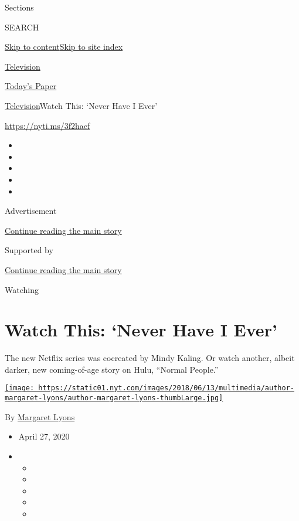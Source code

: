 Sections

SEARCH

\protect\hyperlink{site-content}{Skip to
content}\protect\hyperlink{site-index}{Skip to site index}

\href{https://www.nytimes.com/section/arts/television}{Television}

\href{https://myaccount.nytimes.com/auth/login?response_type=cookie\&client_id=vi}{}

\href{https://www.nytimes.com/section/todayspaper}{Today's Paper}

\href{/section/arts/television}{Television}\textbar{}Watch This: `Never
Have I Ever'

\href{https://nyti.ms/3f2hacf}{https://nyti.ms/3f2hacf}

\begin{itemize}
\item
\item
\item
\item
\item
\end{itemize}

Advertisement

\protect\hyperlink{after-top}{Continue reading the main story}

Supported by

\protect\hyperlink{after-sponsor}{Continue reading the main story}

Watching

\hypertarget{watch-this-never-have-i-ever}{%
\section{Watch This: `Never Have I
Ever'}\label{watch-this-never-have-i-ever}}

The new Netflix series was cocreated by Mindy Kaling. Or watch another,
albeit darker, new coming-of-age story on Hulu, ``Normal People.''

\href{https://www.nytimes.com/by/margaret-lyons}{\texttt{[image: https://static01.nyt.com/images/2018/06/13/multimedia/author-margaret-lyons/author-margaret-lyons-thumbLarge.jpg]}}

By \href{https://www.nytimes.com/by/margaret-lyons}{Margaret Lyons}

\begin{itemize}
\item
  April 27, 2020
\item
  \begin{itemize}
  \item
  \item
  \item
  \item
  \item
  \end{itemize}
\end{itemize}


